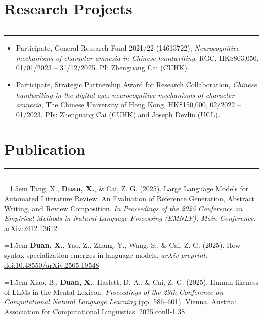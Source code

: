 \documentclass[11pt,a4paper]{article}
\begin{document}
\vspace{-1.5em} 
\section*{Research Projects}
\vspace{-.5em}
\hrule
\vspace{0.3ex}
\hrule

\begin{itemize}[leftmargin=*]
\item Participate, General Research Fund 2021/22 (14613722), \textit{Neurocognitive mechanisms of character amnesia in Chinese handwriting}, RGC, HK\$803,050, 01/01/2023 – 31/12/2025. PI: Zhenguang Cai (CUHK).

\item Participate, Strategic Partnership Award for Research Collaboration, \textit{Chinese handwriting in the digital age: neurocognitive mechanisms of character amnesia}, The Chinese University of Hong Kong, HK\$150,000, 02/2022 – 01/2023. PIs: Zhenguang Cai (CUHK) and Joseph Devlin (UCL).
    
\end{itemize}
\vspace{-1.5em} 
\section*{Publication}
\vspace{-.5em}
\hrule
\vspace{0.3ex}
\hrule

\hangindent=1.5em  Tang, X., \textbf{Duan, X.}, \& Cai, Z. G. (2025). Large Language Models for Automated Literature Review: An Evaluation of Reference Generation, Abstract Writing, and Review Composition. \textit{In Proceedings of the 2025 Conference on Empirical Methods in Natural Language Processing (EMNLP), Main Conference}. \href{https://doi.org/10.48550/arXiv.2412.13612}{arXiv:2412.13612}

\hangindent=1.5em  \textbf{Duan, X.}, Yao, Z., Zhang, Y., Wang, S., \& Cai, Z. G. (2025). How syntax specialization emerges in language models. \textit{arXiv preprint}. \href{https://doi.org/10.48550/arXiv.2505.19548}{
doi:10.48550/arXiv.2505.19548}

\hangindent=1.5em  Xiao, B., \textbf{Duan, X.}, Haslett, D. A., \& Cai, Z. G. (2025). Human-likeness of LLMs in the Mental Lexicon. \textit{Proceedings of the 29th Conference on Computational Natural Language Learning} (pp. 586–601). Vienna, Austria: Association for Computational Linguistics. \href{https://aclanthology.org/2025.conll-1.38/}{2025.conll-1.38}
\end{document}
